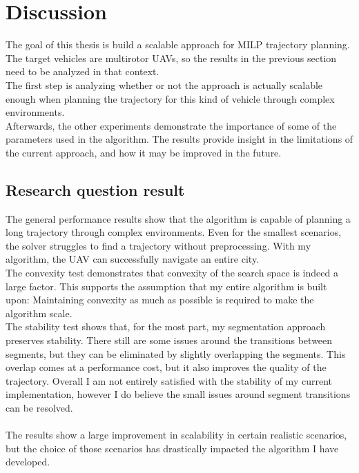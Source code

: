 \chapter{Discussion}
The goal of this thesis is build a scalable approach for MILP trajectory planning. The target vehicles are multirotor UAVs, so the results in the previous section need to be analyzed in that context. \\
The first step is analyzing whether or not the approach is actually scalable enough when planning the trajectory for this kind of vehicle through complex environments.\\
Afterwards, the other experiments demonstrate the importance of some of the parameters used in the algorithm. The results provide insight in the limitations of the current approach, and how it may be improved in the future.

\section{Research question result}


The general performance results show that the algorithm is capable of planning a long trajectory through complex environments. Even for the smallest scenarios, the solver struggles to find a trajectory without preprocessing. With my algorithm, the UAV can successfully navigate an entire city. \\
The convexity test demonstrates that convexity of the search space is indeed a large factor. This supports the assumption that my entire algorithm is built upon: Maintaining convexity as much as possible is required to make the algorithm scale. \\
The stability test shows that, for the most part, my segmentation approach preserves stability. There still are some issues around the transitions between segments, but they can be eliminated by slightly overlapping the segments. This overlap comes at a performance cost, but it also improves the quality of the trajectory. Overall I am not entirely satisfied with the stability of my current implementation, however I do believe the small issues around segment transitions can be resolved. \\\\

The results show a large improvement in scalability in certain realistic scenarios, but the choice of those scenarios has drastically impacted the algorithm I have developed.\\

